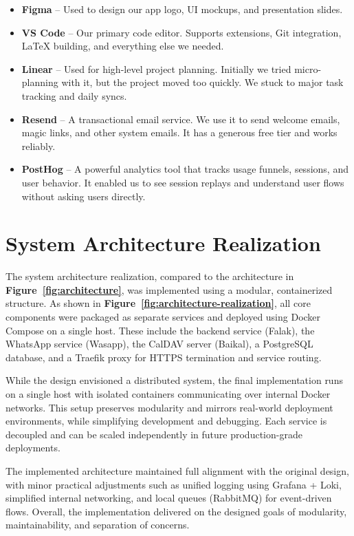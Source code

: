 \begin{itemize}
    \item \textbf{Figma} – Used to design our app logo, UI mockups, and presentation slides.
    \item \textbf{VS Code} – Our primary code editor. Supports extensions, Git integration, LaTeX building, and everything else we needed.
    \item \textbf{Linear} – Used for high-level project planning. Initially we tried micro-planning with it, but the project moved too quickly. We stuck to major task tracking and daily syncs.
    \item \textbf{Resend} – A transactional email service. We use it to send welcome emails, magic links, and other system emails. It has a generous free tier and works reliably.
    \item \textbf{PostHog} – A powerful analytics tool that tracks usage funnels, sessions, and user behavior. It enabled us to see session replays and understand user flows without asking users directly.
\end{itemize}

\section{System Architecture Realization}

The system architecture realization, compared to the architecture in \textbf{Figure~\ref{fig:architecture}}, was implemented using a modular, containerized structure. As shown in \textbf{Figure~\ref{fig:architecture-realization}}, all core components were packaged as separate services and deployed using Docker Compose on a single host. These include the backend service (Falak), the WhatsApp service (Wasapp), the CalDAV server (Baikal), a PostgreSQL database, and a Traefik proxy for HTTPS termination and service routing.

While the design envisioned a distributed system, the final implementation runs on a single host with isolated containers communicating over internal Docker networks. This setup preserves modularity and mirrors real-world deployment environments, while simplifying development and debugging. Each service is decoupled and can be scaled independently in future production-grade deployments.

The implemented architecture maintained full alignment with the original design, with minor practical adjustments such as unified logging using Grafana + Loki, simplified internal networking, and local queues (RabbitMQ) for event-driven flows. Overall, the implementation delivered on the designed goals of modularity, maintainability, and separation of concerns.

